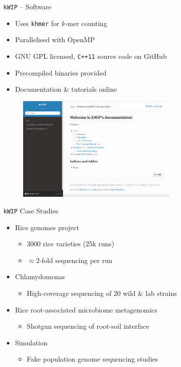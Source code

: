 \documentclass[t]{beamer}
\begin{document}
\begin{frame}{\texttt{kWIP} -- Software}
  \begin{itemize}
    \item Uses \texttt{khmer} for $k$-mer counting
    \item Parallelised with OpenMP
    \item GNU GPL licensed, \texttt{C++11} source code on GitHub
    \item Precompiled binaries provided
    \item Documentation \& tutorials online
  \end{itemize}
  \begin{figure}
    \centering
    \includegraphics[width=0.7\textwidth]{img/kwip-doc-screenshot.png}
  \end{figure}
\end{frame}

\begin{frame}{\texttt{kWIP} Case Studies}
  \begin{itemize}
    \item Rice genomes project
        \autocite{the_3000_rice_genomes_project_3000_2014}
      \begin{itemize}
        \item 3000 rice varieties (25k runs)
        \item $\approx 2$-fold sequencing per run
      \end{itemize}
    \item Chlamydomonas \autocite{flowers_whole-genome_2015}
      \begin{itemize}
        \item High-coverage sequencing of 20 wild \& lab strains
      \end{itemize}
    \item Rice root-associated microbiome metagenomics
      \begin{itemize}
        \item Shotgun sequencing of root-soil interface
      \end{itemize}
    \item Simulation
      \begin{itemize}
        \item Fake population genome sequencing studies
      \end{itemize}
  \end{itemize}
\end{frame}
\end{document}
